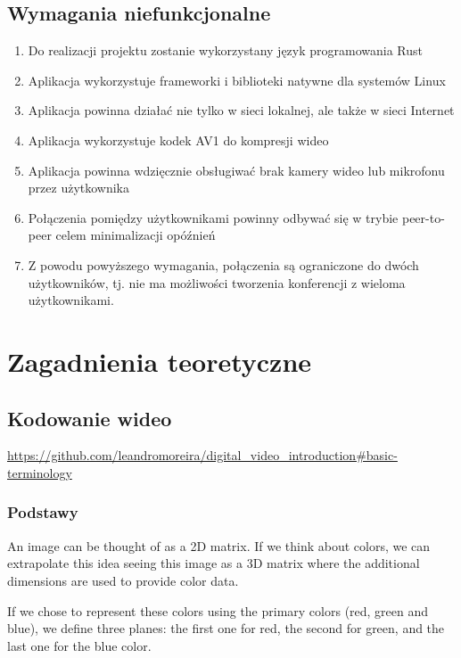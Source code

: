 \section{Wymagania niefunkcjonalne}

\begin{enumerate}
	\item Do realizacji projektu zostanie wykorzystany język programowania Rust
	\item Aplikacja wykorzystuje frameworki i biblioteki natywne dla systemów Linux
	\item Aplikacja powinna działać nie tylko w sieci lokalnej, ale także w sieci Internet
	\item Aplikacja wykorzystuje kodek AV1 do kompresji wideo
	\item Aplikacja powinna wdzięcznie obsługiwać brak kamery wideo lub mikrofonu przez użytkownika
	\item Połączenia pomiędzy użytkownikami powinny odbywać się w trybie peer-to-peer celem
	      minimalizacji opóźnień
	\item Z powodu powyższego wymagania, połączenia są ograniczone do dwóch użytkowników, tj. nie ma
	      możliwości tworzenia konferencji z wieloma użytkownikami.
\end{enumerate}

\chapter{Zagadnienia teoretyczne}

\section{Kodowanie wideo}


\url{https://github.com/leandromoreira/digital_video_introduction#basic-terminology}

\subsection{Podstawy}

An image can be thought of as a 2D matrix. If we think about colors, we can extrapolate this idea
seeing this image as a 3D matrix where the additional dimensions are used to provide color data.

If we chose to represent these colors using the primary colors (red, green and blue), we define
three planes: the first one for red, the second for green, and the last one for the blue color.

